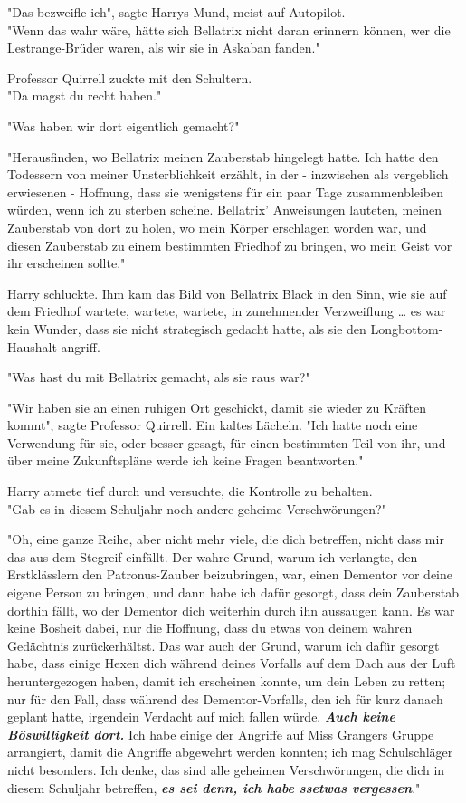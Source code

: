 {"Das bezweifle ich", sagte Harrys Mund, meist auf Autopilot.\\ "Wenn das wahr wäre, hätte sich Bellatrix nicht daran erinnern können, wer die Lestrange-Brüder waren, als wir sie in Askaban fanden."

Professor Quirrell zuckte mit den Schultern.\\ "Da magst du recht haben."

"Was haben wir dort eigentlich gemacht?"

"Herausfinden, wo Bellatrix meinen Zauberstab hingelegt hatte. Ich hatte den Todessern von meiner Unsterblichkeit erzählt, in der - inzwischen als vergeblich erwiesenen - Hoffnung, dass sie wenigstens für ein paar Tage zusammenbleiben würden, wenn ich zu sterben scheine. Bellatrix' Anweisungen lauteten, meinen Zauberstab von dort zu holen, wo mein Körper erschlagen worden war, und diesen Zauberstab zu einem bestimmten Friedhof zu bringen, wo mein Geist vor ihr erscheinen sollte."

Harry schluckte. Ihm kam das Bild von Bellatrix Black in den Sinn, wie sie auf dem Friedhof wartete, wartete, wartete, in zunehmender Verzweiflung … es war kein Wunder, dass sie nicht strategisch gedacht hatte, als sie den Longbottom-Haushalt angriff.

"Was hast du mit Bellatrix gemacht, als sie raus war?"

"Wir haben sie an einen ruhigen Ort geschickt, damit sie wieder zu Kräften kommt", sagte Professor Quirrell. Ein kaltes Lächeln. "Ich hatte noch eine Verwendung für sie, oder besser gesagt, für einen bestimmten Teil von ihr, und über meine Zukunftspläne werde ich keine Fragen beantworten."

Harry atmete tief durch und versuchte, die Kontrolle zu behalten.\\ "Gab es in diesem Schuljahr noch andere geheime Verschwörungen?"

"Oh, eine ganze Reihe, aber nicht mehr viele, die dich betreffen, nicht dass mir das aus dem Stegreif einfällt. Der wahre Grund, warum ich verlangte, den Erstklässlern den Patronus-Zauber beizubringen, war, einen Dementor vor deine eigene Person zu bringen, und dann habe ich dafür gesorgt, dass dein Zauberstab dorthin fällt, wo der Dementor dich weiterhin durch ihn aussaugen kann. Es war keine Bosheit dabei, nur die Hoffnung, dass du etwas von deinem wahren Gedächtnis zurückerhältst. Das war auch der Grund, warum ich dafür gesorgt habe, dass einige Hexen dich während deines Vorfalls auf dem Dach aus der Luft heruntergezogen haben, damit ich erscheinen konnte, um dein Leben zu retten; nur für den Fall, dass während des Dementor-Vorfalls, den ich für kurz danach geplant hatte, irgendein Verdacht auf mich fallen würde. \textbf{\emph{Auch keine Böswilligkeit dort.}} Ich habe einige der Angriffe auf Miss Grangers Gruppe arrangiert, damit die Angriffe abgewehrt werden konnten; ich mag Schulschläger nicht besonders. Ich denke, das sind alle geheimen Verschwörungen, die dich in diesem Schuljahr betreffen, \textbf{\emph{es sei denn, ich habe ssetwas vergessen}}."

}
